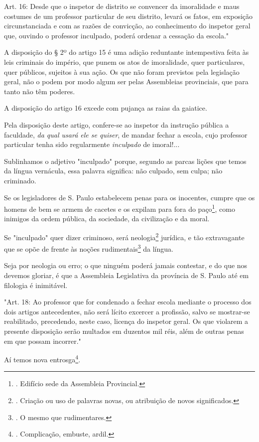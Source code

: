 Art. 16: Desde que o inspetor de distrito se convencer da imoralidade e
maus costumes de um professor particular de seu distrito, levará os
fatos, em exposição circunstanciada e com as razões de convicção, ao
conhecimento do inspetor geral que, ouvindo o professor inculpado,
poderá ordenar a cessação da escola."

A disposição do § 2º do artigo 15 é uma adição reduntante intempestiva
feita às leis criminais do império, que punem os atos de imoralidade,
quer particulares, quer públicos, sujeitos à sua ação. Os que não foram
previstos pela legislação geral, não o podem por modo algum ser pelas
Assembleias provinciais, que para tanto não têm poderes.

A disposição do artigo 16 excede com pujança as raias da gaiatice.

Pela disposição deste artigo, confere-se ao inspetor da instrução
pública a faculdade, \emph{da qual usará ele se quiser}, de mandar
fechar a escola, cujo professor particular tenha sido regularmente
\emph{inculpado} de imoral!...

Sublinhamos o adjetivo "inculpado" porque, segundo as parcas lições que
temos da língua vernácula, essa palavra significa: não culpado, sem
culpa; não criminado.

Se os legisladores de S. Paulo estabelecem penas para os inocentes,
cumpre que os homens de bem se armem de cacetes e os expilam para fora
do paço\footnote{. Edifício sede da Assembleia Provincial.}, como
inimigos da ordem pública, da sociedade, da civilização e da moral.

Se "inculpado" quer dizer criminoso, será neologia\footnote{. Criação ou
  uso de palavras novas, ou atribuição de novos significados.} jurídica,
e tão extravagante que se opõe de frente às noções
rudimentais\footnote{. O mesmo que rudimentares.} da língua.

Seja por neologia ou erro; o que ninguém poderá jamais contestar, e do
que nos devemos gloriar, é que a Assembleia Legislativa da província de
S. Paulo até em filologia é inimitável.

"Art. 18: Ao professor que for condenado a fechar escola mediante o
processo dos dois artigos antecedentes, não será lícito excercer a
profissão, salvo se mostrar-se reabilitado, precedendo, neste caso,
licença do inspetor geral. Os que violarem a presente disposição serão
multados em duzentos mil réis, além de outras penas em que possam
incorrer."

Aí temos nova entrosga\footnote{. Complicação, embuste, ardil.}.

